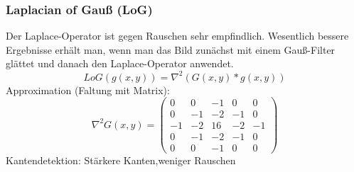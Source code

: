 \subsubsection*{Laplacian of Gauß (LoG)}

Der Laplace-Operator ist gegen Rauschen sehr empfindlich. Wesentlich bessere Ergebnisse erhält man, wenn man das Bild zunächst mit einem Gauß-Filter glättet und danach den Laplace-Operator anwendet. $$LoG(g(x,y)) = \nabla^2 (G(x,y) * g(x,y))$$ Approximation (Faltung mit Matrix): $$\nabla^2 G(x,y) = \left( \begin{array}{rrrrr} 0 & 0 & -1 & 0 & 0 \\ 0 & -1 & -2 & -1 & 0 \\ -1 & -2 & 16 & -2 & -1 \\ 0 & -1 & -2 & -1 & 0 \\ 0 & 0 & -1 & 0 & 0 \end{array} \right)$$
Kantendetektion: Stärkere Kanten,weniger Rauschen

